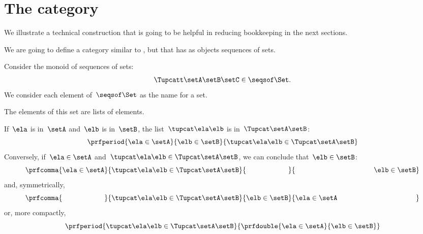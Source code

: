\section{The \SetL category}
\label{sec:SetL}

We illustrate a technical construction that is going to be helpful in reducing bookkeeping in the next sections.

We are going to define a category similar to \Set, but that has as objects sequences of sets.

Consider the monoid of sequences of sets:
%
\begin{equation}
    \label{eq:sets-monoid}
    \Tupcatt \setA  \setB  \setC \in \seqsof\Set.
\end{equation}
%
We consider each element of~$\seqsof\Set$ as the name for a set.

The elements of this set are lists of elements.

If~$\ela$ is in~$\setA$ and~$\elb$ is in~$\setB$, the list~$\tupcat \ela \elb$ is in~$\Tupcat \setA \setB$:
%
\begin{equation}
    \label{eq:sets-monoid-axiom1}
    \prfperiod{
        \ela \in \setA
    }{
        \elb \in \setB
    }{
        \tupcat \ela \elb \in \Tupcat \setA \setB
    }
\end{equation}
%
Conversely, if~$\ela \in \setA$ and~$\tupcat \ela \elb \in \Tupcat \setA \setB$, we can conclude that~$\elb \in \setB$:
%
\begin{equation}
    \label{eq:sets-monoid-axiom2}
    \prfcomma{
        \ela \in \setA
    }{
        \tupcat \ela \elb \in \Tupcat \setA  \setB
    }{
        \phantom{\elb \in \setB}
    }{
        \rule{39mm}{0pt} \elb \in  \setB
    }
\end{equation}
%
and, symmetrically,
%
\begin{equation}
    \label{eq:sets-monoid-axiom3}
    \prfcomma{
        \phantom{\ela \in \setA}
    }{
        \tupcat \ela \elb \in \Tupcat \setA \setB
    }{
        \elb \in \setB
    }{
        \ela \in  \setA \rule{39mm}{0pt}
    }
\end{equation}
%
or, more compactly,
%
\begin{equation}
    \label{eq:sets-monoid-axiom3bis}
    \prfperiod{
        \tupcat \ela \elb \in \Tupcat \setA \setB
    }{
        \prfdouble{
            \ela \in \setA
        }{
            \elb \in \setB
        }
    }
\end{equation}
%

